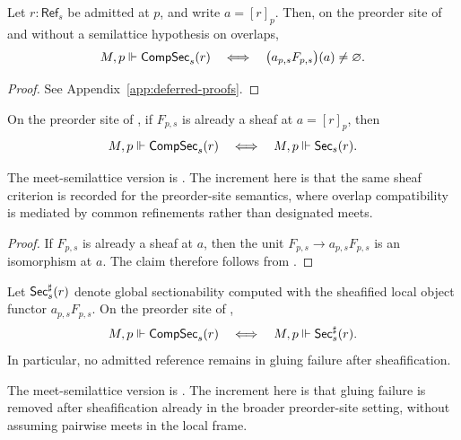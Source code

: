 \begin{proposition}\label{thm:sheafification-characterization}
Let $r:\mathsf{Ref}_s$ be admitted at $p$, and write $a=[r]_p$. Then, on the preorder site of  and without a semilattice hypothesis on overlaps,
\[
M,p\Vdash \mathsf{CompSec}_s(r)
\quad\Longleftrightarrow\quad
\bigl(a_{p,s}F_{p,s}\bigr)(a)\neq\varnothing.
\]
\end{proposition}

\begin{proof}
See Appendix~\ref{app:deferred-proofs}.
\end{proof}

\begin{corollary}\label{cor:sheaf-local-to-global}
On the preorder site of , if $F_{p,s}$ is already a sheaf at $a=[r]_p$, then
\[
M,p\Vdash \mathsf{CompSec}_s(r)
\quad\Longleftrightarrow\quad
M,p\Vdash \mathsf{Sec}_s(r).
\]
\end{corollary}

\begin{remark}
The meet-semilattice version is \cite[Corollary~4.8]{MaZhang2026ConditionalGluingFailure}. The increment here is that the same sheaf criterion is recorded for the preorder-site semantics, where overlap compatibility is mediated by common refinements rather than designated meets.
\end{remark}

\begin{proof}
If $F_{p,s}$ is already a sheaf at $a$, then the unit $F_{p,s}\to a_{p,s}F_{p,s}$ is an isomorphism at $a$. The claim therefore follows from .
\end{proof}

\begin{corollary}\label{cor:sheafification-removes-glue}
Let $\mathsf{Sec}_s^{\sharp}(r)$ denote global sectionability computed with the sheafified local object functor $a_{p,s}F_{p,s}$. On the preorder site of ,
\[
M,p\Vdash \mathsf{CompSec}_s(r)
\quad\Longleftrightarrow\quad
M,p\Vdash \mathsf{Sec}_s^{\sharp}(r).
\]
In particular, no admitted reference remains in gluing failure after sheafification.
\end{corollary}

\begin{remark}
The meet-semilattice version is \cite[Corollary~4.9]{MaZhang2026ConditionalGluingFailure}. The increment here is that gluing failure is removed after sheafification already in the broader preorder-site setting, without assuming pairwise meets in the local frame.
\end{remark}

